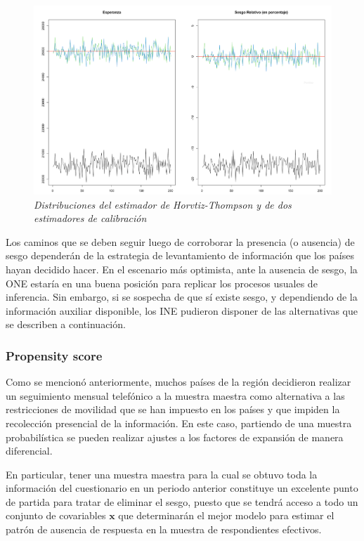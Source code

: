 \documentclass[
  10pt,
  spanish,
]{book}
\begin{document}
\begin{figure}
\centering
\includegraphics{Pics/calnr2.png}
\caption{\emph{Distribuciones del estimador de Horvtiz-Thompson y de dos estimadores de calibración}}
\end{figure}

Los caminos que se deben seguir luego de corroborar la presencia (o ausencia) de sesgo dependerán de la estrategia de levantamiento de información que los países hayan decidido hacer. En el escenario más optimista, ante la ausencia de sesgo, la ONE estaría en una buena posición para replicar los procesos usuales de inferencia. Sin embargo, si se sospecha de que sí existe sesgo, y dependiendo de la información auxiliar disponible, los INE pudieron disponer de las alternativas que se describen a continuación.

\hypertarget{propensity-score-1}{%
\subsubsection*{Propensity score}\label{propensity-score-1}}

Como se mencionó anteriormente, muchos países de la región decidieron realizar un seguimiento mensual telefónico a la muestra maestra como alternativa a las restricciones de movilidad que se han impuesto en los países y que impiden la recolección presencial de la información. En este caso, partiendo de una muestra probabilística se pueden realizar ajustes a los factores de expansión de manera diferencial.

En particular, tener una muestra maestra para la cual se obtuvo toda la información del cuestionario en un periodo anterior constituye un excelente punto de partida para tratar de eliminar el sesgo, puesto que se tendrá acceso a todo un conjunto de covariables \(\mathbf{x}\) que determinarán el mejor modelo para estimar el patrón de ausencia de respuesta en la muestra de respondientes efectivos.
\end{document}
